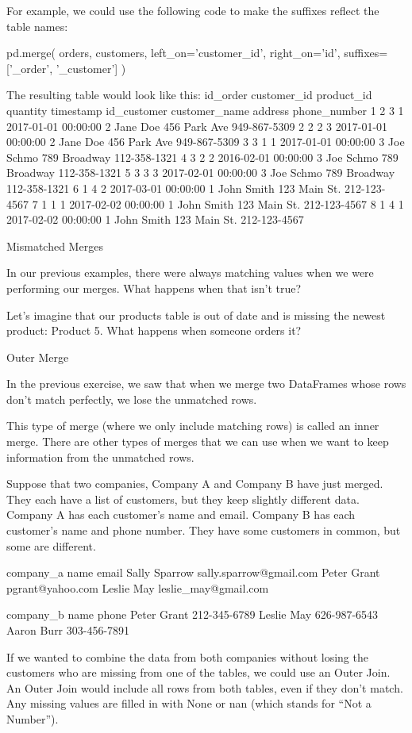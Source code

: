 \documentclass{journal}
\begin{document}
For example, we could use the following code to make the suffixes reflect the table names:

pd.merge(
    orders,
    customers,
    left_on='customer_id',
    right_on='id',
    suffixes=['_order', '_customer']
)

The resulting table would look like this:
id_order 	customer_id 	product_id 	quantity 	timestamp 	id_customer 	customer_name 	address 	phone_number
1 	2 	3 	1 	2017-01-01 00:00:00 	2 	Jane Doe 	456 Park Ave 	949-867-5309
2 	2 	2 	3 	2017-01-01 00:00:00 	2 	Jane Doe 	456 Park Ave 	949-867-5309
3 	3 	1 	1 	2017-01-01 00:00:00 	3 	Joe Schmo 	789 Broadway 	112-358-1321
4 	3 	2 	2 	2016-02-01 00:00:00 	3 	Joe Schmo 	789 Broadway 	112-358-1321
5 	3 	3 	3 	2017-02-01 00:00:00 	3 	Joe Schmo 	789 Broadway 	112-358-1321
6 	1 	4 	2 	2017-03-01 00:00:00 	1 	John Smith 	123 Main St. 	212-123-4567
7 	1 	1 	1 	2017-02-02 00:00:00 	1 	John Smith 	123 Main St. 	212-123-4567
8 	1 	4 	1 	2017-02-02 00:00:00 	1 	John Smith 	123 Main St. 	212-123-4567
							
Mismatched Merges

In our previous examples, there were always matching values when we were performing our merges. What happens when that isn’t true?

Let’s imagine that our products table is out of date and is missing the newest product: Product 5. What happens when someone orders it?

Outer Merge

In the previous exercise, we saw that when we merge two DataFrames whose rows don’t match perfectly, we lose the unmatched rows.

This type of merge (where we only include matching rows) is called an inner merge. There are other types of merges that we can use when we want to keep information from the unmatched rows.

Suppose that two companies, Company A and Company B have just merged. They each have a list of customers, but they keep slightly different data. Company A has each customer’s name and email. Company B has each customer’s name and phone number. They have some customers in common, but some are different.

company_a
name 	email
Sally Sparrow 	sally.sparrow@gmail.com
Peter Grant 	pgrant@yahoo.com
Leslie May 	leslie_may@gmail.com

company_b
name 	phone
Peter Grant 	212-345-6789
Leslie May 	626-987-6543
Aaron Burr 	303-456-7891

If we wanted to combine the data from both companies without losing the customers who are missing from one of the tables, we could use an Outer Join. An Outer Join would include all rows from both tables, even if they don’t match. Any missing values are filled in with None or nan (which stands for “Not a Number”).
\end{document}
